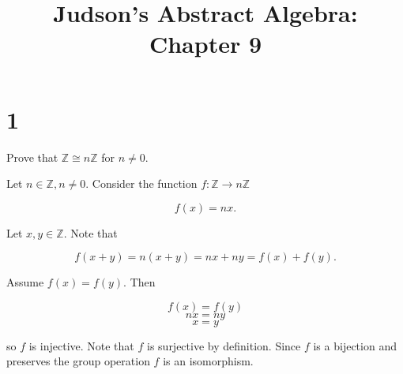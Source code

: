 \documentclass[a4paper]{article}
\title{Judson's Abstract Algebra: Chapter 9}
\date{}
\begin{document}
\maketitle

\section*{1}

Prove that $\mathbb{Z} \cong n \mathbb{Z}$ for $n \neq 0$.

\vspace{\baselineskip}

Let $n \in \mathbb{Z}, n \neq 0$. Consider the function $f : \mathbb{Z} \rightarrow n \mathbb{Z}$

$$f(x) = nx.$$

Let $x,y \in \mathbb{Z}$. Note that 

$$f(x+y) = n(x+y) = nx + ny = f(x) + f(y).$$

Assume $f(x) = f(y)$. Then

$$f(x) = f(y)$$
$$nx = ny$$
$$x = y$$

so $f$ is injective. Note that $f$ is surjective by definition. Since $f$ is a bijection and preserves the group operation $f$ is an isomorphism.
\end{document}
